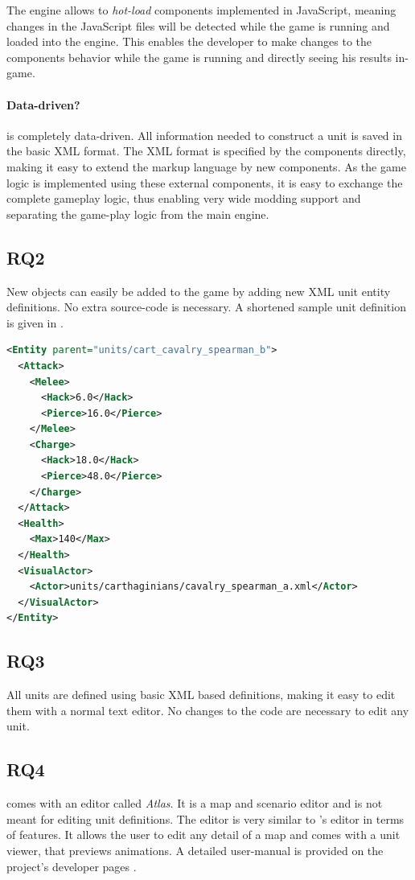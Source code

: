 The engine allows to \textit{hot-load} components implemented in JavaScript, meaning changes in the JavaScript files will
be detected while the game is running and loaded into the engine. This enables the developer to make changes to the
components behavior while the game is running and directly seeing his results in-game.

\paragraph{Data-driven?}
\AD{} is completely data-driven. All information needed to construct a unit is saved in the basic XML format.
The XML format is specified by the components directly, making it easy to extend the markup language by new components.
As the game logic is implemented using these external components, it is easy to exchange the complete gameplay logic,
thus enabling very wide modding support and separating the game-play logic from the main engine.

\subsection{RQ2}
New objects can easily be added to the game by adding new XML unit entity definitions. No extra source-code is
necessary. A shortened sample unit definition is given in .

\begin{lstlisting}[language=XML,caption=A basic \AD{} (shortened) unit definition in XML, label=0adxml]
<Entity parent="units/cart_cavalry_spearman_b">
  <Attack>
    <Melee>
      <Hack>6.0</Hack>
      <Pierce>16.0</Pierce>
    </Melee>
    <Charge>
      <Hack>18.0</Hack>
      <Pierce>48.0</Pierce>
    </Charge>
  </Attack>
  <Health>
    <Max>140</Max>
  </Health>
  <VisualActor>
    <Actor>units/carthaginians/cavalry_spearman_a.xml</Actor>
  </VisualActor>
</Entity>
\end{lstlisting}

\subsection{RQ3}
All units are defined using basic XML based definitions, making it easy to edit them with a normal text editor. No
changes to the code are necessary to edit any unit.

\subsection{RQ4}
\AD{} comes with an editor called \textit{Atlas}. It is a map and scenario editor and is not meant for editing unit
definitions. The editor is very similar to \GLEST{}'s editor in terms of features. It allows the user to edit any detail
of a map and comes with a unit viewer, that previews animations. A detailed user-manual is provided on the project's developer
pages \cite{0adeditor}.

